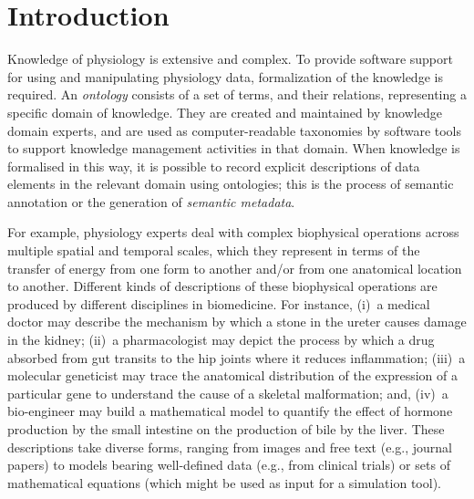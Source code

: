 \section{Introduction}                                                                   %

Knowledge of physiology is extensive and complex. To provide software support for using and
manipulating physiology data, formalization of the knowledge is required. An \emph{ontology}
consists of a set of terms, and their relations, representing a specific domain of knowledge. They
are created and maintained by knowledge domain experts, and are used as computer-readable taxonomies
by software tools to support knowledge management activities in that domain. When knowledge is
formalised in this way, it is possible to record explicit descriptions of data elements in the
relevant domain using ontologies; this is the process of semantic annotation or the generation of
\emph{semantic metadata}.

%

For example, physiology experts deal with complex biophysical operations across multiple spatial and
temporal scales, which they represent in terms of the transfer of energy from one form to another
and/or from one anatomical location to another. Different kinds of descriptions of these biophysical
operations are produced by different disciplines in biomedicine. For instance, (i)~a medical doctor
may describe the mechanism by which a stone in the ureter causes damage in the kidney; (ii)~a
pharmacologist may depict the process by which a drug absorbed from gut transits to the hip joints
where it reduces inflammation; (iii)~a molecular geneticist may trace the anatomical distribution of
the expression of a particular gene to understand the cause of a skeletal malformation; and, (iv)~a
bio-engineer may build a mathematical model to quantify the effect of hormone production by the
small intestine on the production of bile by the liver. These descriptions take diverse forms,
ranging from images and free text (e.g., journal papers) to models bearing well-defined data (e.g.,
from clinical trials) or sets of mathematical equations (which might be used as input for a
simulation tool).


